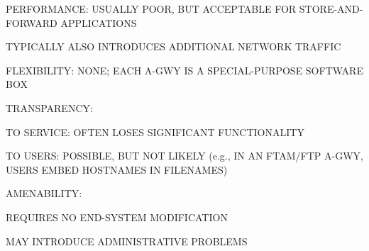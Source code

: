 



\begin{bwslide}

\begin{nrtc}
\item	PERFORMANCE: USUALLY POOR, BUT ACCEPTABLE FOR STORE-AND-FORWARD
	APPLICATIONS
    \begin{nrtc}
    \item	TYPICALLY ALSO INTRODUCES ADDITIONAL NETWORK TRAFFIC
    \end{nrtc}

\item	FLEXIBILITY: NONE; EACH A-GWY IS A SPECIAL-PURPOSE SOFTWARE BOX

\item	TRANSPARENCY: 
    \begin{nrtc}
    \item	TO SERVICE: OFTEN LOSES SIGNIFICANT FUNCTIONALITY

    \item	TO USERS: POSSIBLE, BUT NOT LIKELY (e.g., IN AN FTAM/FTP A-GWY,
		USERS EMBED HOSTNAMES IN FILENAMES)
    \end{nrtc}

\item	AMENABILITY:
    \begin{nrtc}
    \item	REQUIRES NO END-SYSTEM MODIFICATION

    \item	MAY INTRODUCE ADMINISTRATIVE PROBLEMS
    \end{nrtc}
\end{nrtc}
\end{bwslide}


